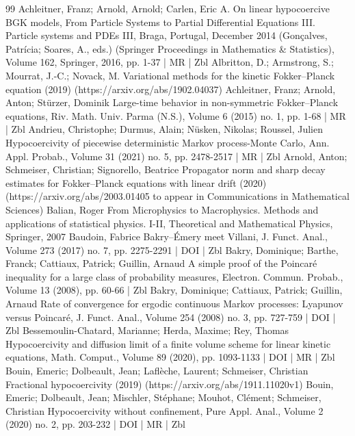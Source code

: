 \begin{thebibliography}{99}
Achleitner, Franz; Arnold, Arnold; Carlen, Eric A. On linear hypocoercive BGK models, From Particle Systems to Partial Differential Equations III. Particle systems and PDEs III, Braga, Portugal, December 2014 (Gonçalves, Patrícia; Soares, A., eds.) (Springer Proceedings in Mathematics \& Statistics), Volume 162, Springer, 2016, pp. 1-37 | MR | Zbl
Albritton, D.; Armstrong, S.; Mourrat, J.-C.; Novack, M. Variational methods for the kinetic Fokker–Planck equation (2019) (https://arxiv.org/abs/1902.04037)
Achleitner, Franz; Arnold, Anton; Stürzer, Dominik Large-time behavior in non-symmetric Fokker–Planck equations, Riv. Math. Univ. Parma (N.S.), Volume 6 (2015) no. 1, pp. 1-68 | MR | Zbl
Andrieu, Christophe; Durmus, Alain; Nüsken, Nikolas; Roussel, Julien Hypocoercivity of piecewise deterministic Markov process-Monte Carlo, Ann. Appl. Probab., Volume 31 (2021) no. 5, pp. 2478-2517 | MR | Zbl
Arnold, Anton; Schmeiser, Christian; Signorello, Beatrice Propagator norm and sharp decay estimates for Fokker–Planck equations with linear drift (2020) (https://arxiv.org/abs/2003.01405 to appear in Communications in Mathematical Sciences)
Balian, Roger From Microphysics to Macrophysics. Methods and applications of statistical physics. I-II, Theoretical and Mathematical Physics, Springer, 2007
Baudoin, Fabrice Bakry–Émery meet Villani, J. Funct. Anal., Volume 273 (2017) no. 7, pp. 2275-2291 | DOI | Zbl
Bakry, Dominique; Barthe, Franck; Cattiaux, Patrick; Guillin, Arnaud A simple proof of the Poincaré inequality for a large class of probability measures, Electron. Commun. Probab., Volume 13 (2008), pp. 60-66 | Zbl
Bakry, Dominique; Cattiaux, Patrick; Guillin, Arnaud Rate of convergence for ergodic continuous Markov processes: Lyapunov versus Poincaré, J. Funct. Anal., Volume 254 (2008) no. 3, pp. 727-759 | DOI | Zbl
Bessemoulin-Chatard, Marianne; Herda, Maxime; Rey, Thomas Hypocoercivity and diffusion limit of a finite volume scheme for linear kinetic equations, Math. Comput., Volume 89 (2020), pp. 1093-1133 | DOI | MR | Zbl
Bouin, Emeric; Dolbeault, Jean; Laflèche, Laurent; Schmeiser, Christian Fractional hypocoercivity (2019) (https://arxiv.org/abs/1911.11020v1)
Bouin, Emeric; Dolbeault, Jean; Mischler, Stéphane; Mouhot, Clément; Schmeiser, Christian Hypocoercivity without confinement, Pure Appl. Anal., Volume 2 (2020) no. 2, pp. 203-232 | DOI | MR | Zbl

\end{thebibliography}

